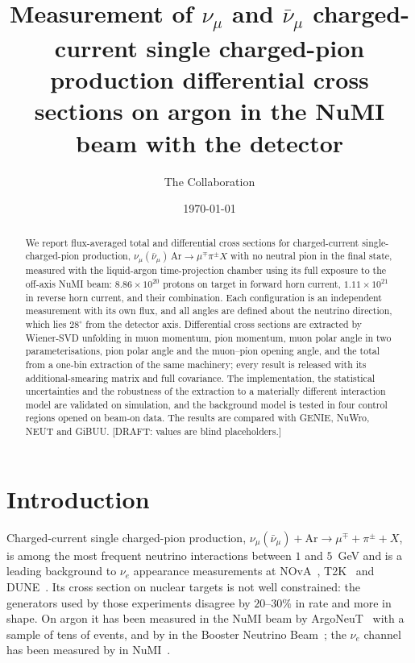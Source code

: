 \documentclass[aps,prd,twocolumn,superscriptaddress,nofootinbib,floatfix]{revtex4-2}
\begin{document}
\title{Measurement of $\nu_\mu$ and $\bar\nu_\mu$ charged-current single charged-pion production
  differential cross sections on argon in the NuMI beam with the \uboone{} detector}

\author{The \uboone{} Collaboration}
\noaffiliation

\date{\today}

\begin{abstract}
We report flux-averaged total and differential cross sections for charged-current
single-charged-pion production, $\nu_\mu(\bar\nu_\mu)\,\mathrm{Ar}\to\mu^\mp\pi^\pm X$ with no
neutral pion in the final state, measured with the \uboone{} liquid-argon time-projection chamber
using its full exposure to the off-axis NuMI beam: $8.86\times10^{20}$ protons on target in forward
horn current, $1.11\times10^{21}$ in reverse horn current, and their combination. Each
configuration is an independent measurement with its own flux, and all angles are defined about the
neutrino direction, which lies $28^\circ$ from the detector axis. Differential cross sections are
extracted by Wiener-SVD unfolding in muon momentum, pion momentum, muon polar angle in two
parameterisations, pion polar angle and the muon--pion opening angle, and the total from a one-bin
extraction of the same machinery; every result is released with its additional-smearing matrix and
full covariance. The implementation, the statistical uncertainties and the robustness of the
extraction to a materially different interaction model are validated on simulation, and the
background model is tested in four control regions opened on beam-on data. The results are compared
with GENIE, NuWro, NEUT and GiBUU. [DRAFT: values are blind placeholders.]
\end{abstract}

\maketitle
\draftbanner

\section{Introduction}

Charged-current single charged-pion production,
$\nu_\mu(\bar\nu_\mu)+\mathrm{Ar}\to\mu^\mp+\pi^\pm+X$, is among the most frequent neutrino
interactions between $1$ and $5$~GeV and is a leading background to $\nu_e$ appearance
measurements at NOvA~\cite{nova}, T2K~\cite{t2k} and DUNE~\cite{dune}. Its cross section on
nuclear targets is not well constrained: the generators used by those experiments disagree by
$20$--$30\%$ in rate and more in shape. On argon it has been measured in the NuMI beam by
ArgoNeuT~\cite{argoneut_ccpi} with a sample of tens of events, and by \uboone{} in the Booster
Neutrino Beam~\cite{uboone_bnb2026_ccpi}; the $\nu_e$ channel has been measured by \uboone{} in
NuMI~\cite{uboone_nue_ccpi}.
\end{document}
